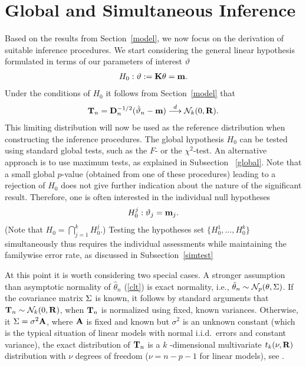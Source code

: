 \documentclass[12pt,a4paper]{article}
\begin{document}
\section{Global and Simultaneous Inference}

\label{siminf}

Based on the results from Section~\ref{model}, we now focus on the
derivation of suitable inference procedures. We start considering the
general linear hypothesis \citep{Searle1971} formulated in terms
of our parameters of interest $\vartheta$
\begin{eqnarray*}
H_0: \vartheta := \mathbf{K} \theta = \mathbf{m}.
\end{eqnarray*}
Under the conditions of $H_0$ it follows from Section~\ref{model} that 
\begin{eqnarray*}
\mathbf{T}_n = \mathbf{D}_n^{-1/2} (\hat{\vartheta}_n - \mathbf{m}) \stackrel{d}{\longrightarrow} \mathcal{N}_k(0, \mathbf{R}). 
\end{eqnarray*}
This
limiting distribution will now be used as the reference distribution when
constructing the inference procedures. The global hypothesis $H_0$ can be
tested using standard global tests, such as the $F$- or the $\chi^2$-test.
An alternative approach is to use maximum tests, as explained in Subsection~%
\ref{global}. Note that a small global $p$-value (obtained from one of these
procedures) leading to a rejection of $H_0$ 
does not give further indication about the nature of the significant
result. Therefore, one is often interested in the individual null hypotheses 
\begin{eqnarray*}
H_0^j: \vartheta_j = \mathbf{m}_j.
\end{eqnarray*}
(Note that $H_0 = \bigcap_{j = 1}^k H_0^j$.) Testing the hypotheses set $%
\{H_0^1, \ldots, H_0^k\}$ simultaneously thus requires the individual
assessments while maintaining the familywise error rate, as discussed in
Subsection~\ref{simtest}

At this point it is worth considering two special cases. A stronger
assumption than asymptotic normality of $\hat{\theta}_n$ (\ref{clt})
is exact normality, i.e., $\hat{\theta}_n \sim \mathcal{N}_p(\theta, \Sigma)$. 
If the covariance matrix $\Sigma$ is known, 
it follows by standard arguments that $\mathbf{T}_n \sim \mathcal{N}_k(0, \mathbf{R})$, when $\mathbf{T}_n$ is
normalized using fixed, known variances. Otherwise, it
$\Sigma = \sigma^2 \mathbf{A}$, where $\mathbf{A}$ is fixed and known but $\sigma^2$ is an unknown
constant (which is the typical situation of linear models with normal
i.i.d.~errors and constant variance), the exact distribution of $\mathbf{T}_n$ is a $k$%
-dimensional multivariate $t_k(\nu, \mathbf{R})$ distribution with $\nu$ degrees
of freedom ($\nu = n - p - 1$ for linear models), see \citep{Tong1990}.
\end{document}
